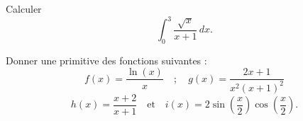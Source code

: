 \documentclass[a4paper, 11pt,openany]{book}%
\newtheorem[L]{thm}{Théorème}[section]
\newtheorem[M]{propo}[thm]{Proposition}
\newtheorem[M]{prop}[thm]{Propriété}
\newtheorem[M]{coro}[thm]{Corollaire}
\newtheorem[M]{lem}[thm]{Lemme}
\newtheorem[M,bodystyle=]{defi}[thm]{Définition}
\newtheorem[M,bodystyle=]{remark}[thm]{Remarque}
\newtheorem[M,bodystyle=]{met}[thm]{Méthode}
\newtheorem[M,bodystyle=]{ret}[thm]{A retenir}
\newtheorem[M,bodystyle=]{idee}[thm]{Idée}
\newtheorem[style=S,underline=false,bodystyle=]{exem}[thm]{Exemple}
\newtheorem[S,underline=false,bodystyle=]{exo}[thm]{Exercice}
\newtheorem[S,underline=false,bodystyle=]{appli}[thm]{Application}
\newtheorem[S,underline=false,bodystyle=]{sol}[thm]{Solution}
\newtheorem[S,underline=false,bodystyle=]{hypo}[thm]{Hypothesis}
\newtheorem[S,underline=false,bodystyle=]{nota}[thm]{Notation}
\begin{document}
\begin{exo}

Calculer
\[ \int_0^3 \frac{\sqrt{x}}{x +1} \, dx.\]

\end{exo}


\begin{sol}

%
\end{sol}

\begin{exo}

Donner une primitive des fonctions suivantes :
\[ f(x) = \frac{\ln(x)}{x} \quad ; \quad  g(x) = \frac{2x + 1}{x^2(x + 1)^2}\]
\[ h(x) = \frac{x+2}{x+1} \quad \text{et} \quad i(x) = 2 \sin \left( \frac{x}{2} \right) \cos \left( \frac{x}{2} \right).\]

\end{exo}
\end{document}
